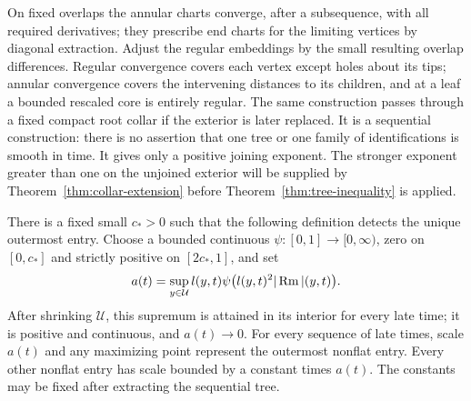 On fixed overlaps the annular charts converge, after a subsequence,
with all required derivatives; they prescribe end charts for the
limiting vertices by diagonal extraction. Adjust the regular
embeddings by the small resulting overlap differences. Regular
convergence covers each vertex except holes about its tips;
annular convergence covers the intervening distances to its children,
and at a leaf a bounded rescaled core is entirely regular.
The same construction passes through a fixed compact root collar if
the exterior is later replaced. It is a sequential construction:
there is no assertion that one tree or one family of identifications
is smooth in time. It gives only a positive joining exponent.
The stronger exponent greater than one on the unjoined exterior
will be supplied by Theorem~\ref{thm:collar-extension} before
Theorem~\ref{thm:tree-inequality} is applied.

\begin{proposition}\label{prop:root-scale}
There is a fixed small $c_*>0$ such that the following definition
detects the unique outermost entry. Choose a bounded continuous
$\psi:[0,1]\to[0,\infty)$, zero on $[0,c_*]$ and strictly positive
on $[2c_*,1]$, and set
\begin{equation}\label{geom:root-definition}
 a(t)=\sup_{y\in\mathcal U}
 l(y,t)\psi\big(l(y,t)^2|\operatorname{Rm}|(y,t)\big).
\end{equation}
After shrinking $\mathcal U$, this supremum is attained in its
interior for every late time; it is positive and continuous, and
$a(t)\to0$. For every sequence of late times, scale $a(t)$ and any
maximizing point represent the outermost nonflat entry. Every other
nonflat entry has scale bounded by a constant times $a(t)$.
The constants may be fixed after extracting the sequential tree.
\end{proposition}

